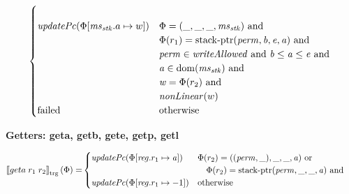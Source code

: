 \documentclass[a4paper]{article}
\newcommand{\sem}[1]{\left\llbracket #1 \right\rrbracket}
\newcommand{\tsem}[2][\Phi]{\sem{#2}_{\mathrm{trg}}(#1)}
\newcommand{\dom}{\mathrm{dom}}
\newcommand{\tand}{\text{ and }}
\newcommand{\totherwise}{\text{otherwise }}
\newcommand{\targetcolor}[1]{\color{black}}
\newcommand{\trg}[1]{{\targetcolor{} #1}}
\newcommand{\zinstr}[1]{#1}
\newcommand{\twoinstr}[3]{
  \ifthenelse{\equal{#2#3}{}}
  {\zinstr{#1}}
  {\zinstr{#1} \; #2 \; #3}
}
\newcommand{\tgeta}[2]{\twoinstr{\trg{geta}}{#1}{#2}}
\newcommand{\update}[2]{[#1 \mapsto #2]}
\newcommand{\updReg}[2]{\update{\reg.#1}{#2}}
\newcommand{\perm}{\var{perm}}
\newcommand{\stkptr}[1]{\mathrm{stack\text{-}ptr}(#1)}
\newcommand{\failed}{\mathrm{failed}}
\newcommand{\var}[1]{\mathit{#1}}
\newcommand{\reg}{\var{reg}}
\newcommand{\ms}{\var{ms}}
\newcommand{\stk}{\var{stk}}
\newcommand{\baddr}{\var{b}}
\newcommand{\eaddr}{\var{e}}
\newcommand{\aaddr}{\var{a}}
\newcommand{\plainfun}[2]{
  \ifthenelse{\equal{#2}{}}
  {\mathit{#1}}
  {\mathit{#1}(#2)}
}
\newcommand{\updPcAddr}[1]{\plainfun{updatePc}{#1}}
\newcommand{\writeAllowed}[1]{\plainfun{writeAllowed}{#1}}
\newcommand{\nonLinear}[1]{\plainfun{nonLinear}{#1}}
\begin{document}
\begin{align*}
\begin{cases}
\begin{array}[t]{l}
                                 \end{array} \\
                                 \updPcAddr{\Phi\update{\ms_\stk.a}{w}} & 
                                 \arraycolsep=0pt
                                 \begin{array}[t]{l}
                                   \Phi = (\_, \_, \_, \ms_\stk) \tand \\
                                   \Phi(r_1) = \stkptr{\perm,\baddr,\eaddr,\aaddr} \tand \\
                                   \perm \in \writeAllowed{} \tand \baddr \leq \aaddr \leq \eaddr \tand \\
                                   \aaddr \in \dom(\ms_\stk) \tand \\
                                   \var{w} = \Phi(r_2) \tand \\
                                   \nonLinear{w}
                                 \end{array} \\
                                 \failed & \totherwise
                               \end{cases}
\end{align*}

\textbf{Getters: geta, getb, gete, getp, getl}

\begin{align*}
  \tsem{\tgeta{r_1}{r_2}} = &
                              \begin{cases}
                                \updPcAddr{\Phi\update{\reg.r_1}{\aaddr}} & 
                                \arraycolsep=0pt
                                \begin{array}[t]{l}
                                  \Phi(r_2) = ((\perm,\_),\_,\_,\aaddr) \text{ or } \\
                                  \quad \Phi(r_2) = \stkptr{\perm,\_,\_,\aaddr} \tand\\
                                \end{array} \\
                                \updPcAddr{\Phi\updReg{r_1}{-1}} & \totherwise
                              \end{cases}
\end{align*}
\end{document}
